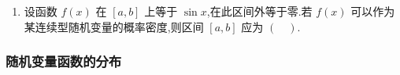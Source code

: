 \begin{enumerate}
\item 设函数 $f(x)$ 在 $[a,b]$ 上等于 $\sin x$,在此区间外等于零.若 $f(x)$ 可以作为某连续型随机变量的概率密度,则区间 $[a,b]$ 应为 $(\quad)$.

\end{enumerate}


\subsubsection{随机变量函数的分布}

